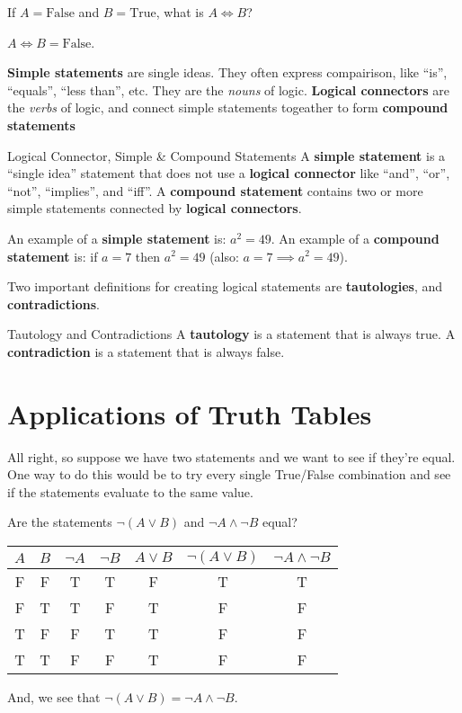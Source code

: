 \begin{boxexample}{}{}
	If $A=\text{False}$ and $B=\text{True}$, what is $A \iff B$?
	
	$A \iff B = \text{False}$.
\end{boxexample}

{\bf Simple statements} are single ideas. They often express compairison, like ``is'', ``equals'', ``less than'', etc. They are the \emph{nouns} of logic. {\bf Logical connectors} are the \emph{verbs} of logic, and connect simple statements togeather to form {\bf compound statements}

\begin{boxdefine}{Logical Connector, Simple \& Compound Statements}{}
	A {\bf simple statement} is a ``single idea'' statement that does not use a {\bf logical connector} like ``and'', ``or'', ``not'', ``implies'', and ``iff''.
	A {\bf compound statement} contains two or more simple statements connected by {\bf logical connectors}.
\end{boxdefine}

\begin{boxexample}{}{}
	An example of a {\bf simple statement} is: $a^2=49$. An example of a {\bf compound statement} is: if $a=7$ then $a^2=49$ (also: $a=7 \implies a^2=49$). 
\end{boxexample}

Two important definitions for creating logical statements are {\bf tautologies}, and {\bf contradictions}.

\begin{boxdefine}{Tautology and Contradictions}{}
	A {\bf tautology} is a statement that is always true. A {\bf contradiction} is a statement that is always false.
\end{boxdefine}

\section{Applications of Truth Tables}

All right, so suppose we have two statements and we want to see if they're equal. One way to do this would be to try every single True/False combination and see if the statements evaluate to the same value.

\begin{boxexample}{}{}
	Are the statements $\neg (A \lor B)$ and $\neg A \land \neg B$ equal?

	\medskip
	\begin{tabular}{g|g|c|c|c|g|g}
		\hline
		$A$ & $B$ & $\neg A$ & $\neg B$ & $A \lor B$ & $\neg (A \lor B)$ & $\neg A \land \neg B$\\
		\hline
		F & F & T & T & F & T & T\\
		F & T & T & F & T & F & F\\
		T & F & F & T & T & F & F\\
		T & T & F & F & T & F & F\\
		\hline
	\end{tabular}
	\medskip

	And, we see that $\neg (A \lor B) = \neg A \land \neg B$.
\end{boxexample}

